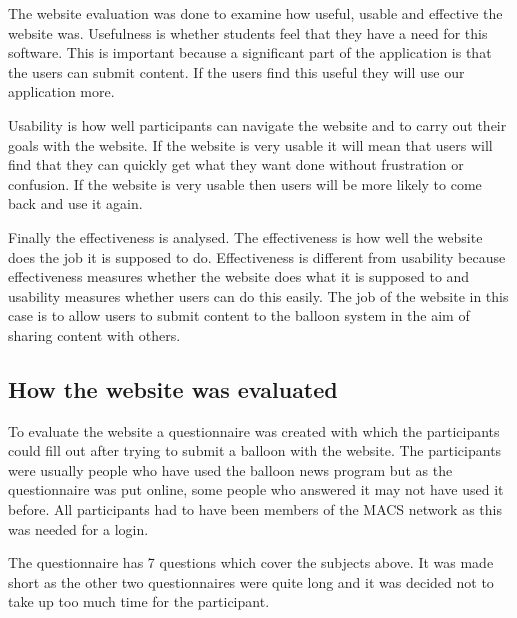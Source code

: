 \newcommand{\webEvalQPic}[1] {
  \begin{figure}[h]
  \begin{centering}
  \texttt{[image: Diagrams/Website-EvalQ\#1.png]}
  \par\end{centering}

  \caption{Evaluation results (Question #1)}
  \label{WebEvalQ#1}
  \end{figure}
}

The website evaluation was done to examine how useful, usable and effective the website was. Usefulness is whether students feel that they have a need for this software. This is important because a significant part of the application is that the users can submit content. If the users find this useful they will use our application more.

Usability is how well participants can navigate the website and to carry out their goals with the website. If the website is very usable it will mean that users will find that they can quickly get what they want done without frustration or confusion. If the website is very usable then users will be more likely to come back and use it again.

Finally the effectiveness is analysed. The effectiveness is how well the website does the job it is supposed to do. Effectiveness is different from usability because effectiveness measures whether the website does what it is supposed to and usability measures whether users can do this easily. The job of the website in this case is to allow users to submit content to the balloon system in the aim of sharing content with others.

\subsection{How the website was evaluated}

To evaluate the website a questionnaire was created with which the participants could fill out after trying to submit a balloon with the website. The participants were usually people who have used the balloon news program but as the questionnaire was put online, some people who answered it may not have used it before. All participants had to have been members of the MACS network as this was needed for a login.

The questionnaire has 7 questions which cover the subjects above. It was made short as the other two questionnaires were quite long and it was decided not to take up too much time for the participant.

